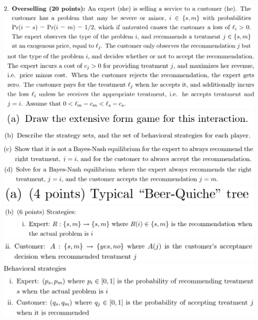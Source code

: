 \documentclass[8pt,landscape]{extarticle}
\begin{document}
\begin{multicols*}{3}
    \includegraphics[width=0.77\linewidth,keepaspectratio]{Screenshots/Screenshot 2024-03-11 134718.png}
    \includegraphics[width=0.75\linewidth,keepaspectratio]{Screenshots/Screenshot 2024-03-11 134723.png}
    \includegraphics[width=0.47\linewidth,keepaspectratio]{Screenshots/Screenshot 2024-03-11 134727.png}
    \includegraphics[width=0.7\linewidth,keepaspectratio]{Screenshots/Screenshot 2024-03-11 134731.png}
    \includegraphics[width=0.73\linewidth,keepaspectratio]{Screenshots/Screenshot 2024-03-11 134734.png}
    \includegraphics[width=0.74\linewidth,keepaspectratio]{Screenshots/Screenshot 2024-03-11 134741.png}
    \includegraphics[width=0.36\linewidth,keepaspectratio]{Screenshots/Screenshot 2024-03-11 134753.png}
    \includegraphics[width=0.74\linewidth,keepaspectratio]{Screenshots/Screenshot 2024-03-11 134757.png}
    \includegraphics[width=0.69\linewidth,keepaspectratio]{Screenshots/Screenshot 2024-03-11 134801.png}
    \includegraphics[width=0.7\linewidth,keepaspectratio]{Screenshots/Screenshot 2024-03-11 134806.png}

\end{multicols*}
\end{document}
